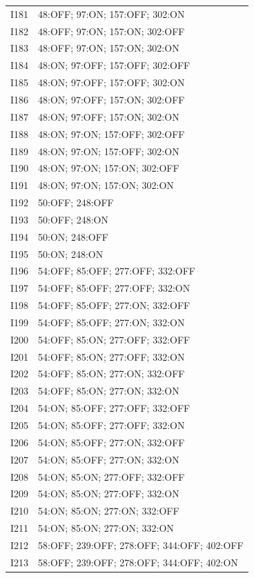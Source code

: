 {\begin{longtable}{lp{.85\linewidth}}
I181 & 48:OFF; 97:ON; 157:OFF; 302:ON \\
I182 & 48:OFF; 97:ON; 157:ON; 302:OFF \\
I183 & 48:OFF; 97:ON; 157:ON; 302:ON \\
I184 & 48:ON; 97:OFF; 157:OFF; 302:OFF \\
I185 & 48:ON; 97:OFF; 157:OFF; 302:ON \\
I186 & 48:ON; 97:OFF; 157:ON; 302:OFF \\
I187 & 48:ON; 97:OFF; 157:ON; 302:ON \\
I188 & 48:ON; 97:ON; 157:OFF; 302:OFF \\
I189 & 48:ON; 97:ON; 157:OFF; 302:ON \\
I190 & 48:ON; 97:ON; 157:ON; 302:OFF \\
I191 & 48:ON; 97:ON; 157:ON; 302:ON \\
I192 & 50:OFF; 248:OFF \\
I193 & 50:OFF; 248:ON \\
I194 & 50:ON; 248:OFF \\
I195 & 50:ON; 248:ON \\
I196 & 54:OFF; 85:OFF; 277:OFF; 332:OFF \\
I197 & 54:OFF; 85:OFF; 277:OFF; 332:ON \\
I198 & 54:OFF; 85:OFF; 277:ON; 332:OFF \\
I199 & 54:OFF; 85:OFF; 277:ON; 332:ON \\
I200 & 54:OFF; 85:ON; 277:OFF; 332:OFF \\
I201 & 54:OFF; 85:ON; 277:OFF; 332:ON \\
I202 & 54:OFF; 85:ON; 277:ON; 332:OFF \\
I203 & 54:OFF; 85:ON; 277:ON; 332:ON \\
I204 & 54:ON; 85:OFF; 277:OFF; 332:OFF \\
I205 & 54:ON; 85:OFF; 277:OFF; 332:ON \\
I206 & 54:ON; 85:OFF; 277:ON; 332:OFF \\
I207 & 54:ON; 85:OFF; 277:ON; 332:ON \\
I208 & 54:ON; 85:ON; 277:OFF; 332:OFF \\
I209 & 54:ON; 85:ON; 277:OFF; 332:ON \\
I210 & 54:ON; 85:ON; 277:ON; 332:OFF \\
I211 & 54:ON; 85:ON; 277:ON; 332:ON \\
I212 & 58:OFF; 239:OFF; 278:OFF; 344:OFF; 402:OFF \\
I213 & 58:OFF; 239:OFF; 278:OFF; 344:OFF; 402:ON \\

\end{longtable}}
